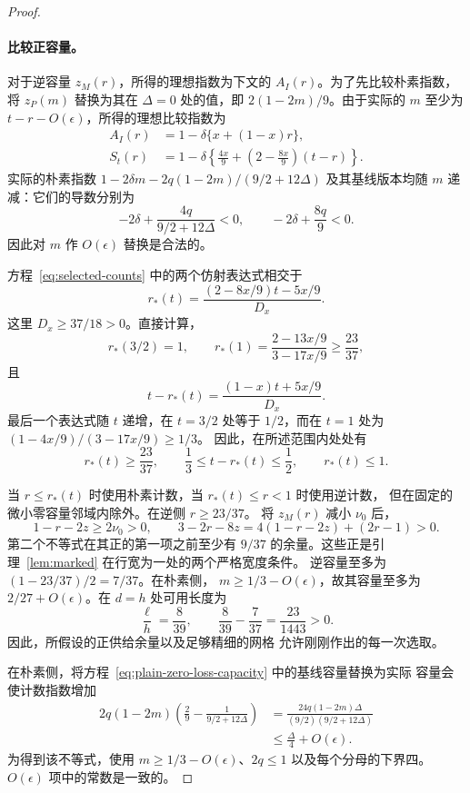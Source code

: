 \documentclass[11pt,a4paper]{article}
\numberwithin{equation}{section}
\numberwithin{figure}{section}
\theoremstyle{definition}
\theoremstyle{remark}
\begin{document}
\begin{proof}
\paragraph{比较正容量。}
对于逆容量 \(z_M(r)\)，所得的理想指数为下文的 \(A_I(r)\)。为了先比较朴素指数，将
\(z_P(m)\) 替换为其在 \(\Delta=0\) 处的值，即
\(2(1-2m)/9\)。由于实际的 \(m\) 至少为
\(t-r-O(\epsilon)\)，所得的理想比较指数为
\begin{equation}
 \begin{aligned}
 A_I(r)&=1-\delta\{x+(1-x)r\},\\
 S_t(r)&=1-\delta\left\{\frac{4x}{9}
          +\left(2-\frac{8x}{9}\right)(t-r)\right\}.
 \end{aligned}
 \label{eq:selected-counts}
\end{equation}
实际的朴素指数
\(1-2\delta m-2q(1-2m)/(9/2+12\Delta)\) 及其基线版本均随 \(m\) 递减：它们的导数分别为
\[
 -2\delta+\frac{4q}{9/2+12\Delta}<0,\qquad
 -2\delta+\frac{8q}{9}<0.
\]
因此对 \(m\) 作 \(O(\epsilon)\) 替换是合法的。

方程~\eqref{eq:selected-counts} 中的两个仿射表达式相交于
\[
 r_*(t)=
 \frac{(2-8x/9)t-5x/9}{D_x}.
\]
这里 \(D_x\ge37/18>0\)。直接计算，
\[
 r_*(3/2)=1,\qquad
 r_*(1)=\frac{2-13x/9}{3-17x/9}\ge\frac{23}{37},
\]
且
\[
 t-r_*(t)=\frac{(1-x)t+5x/9}{D_x}.
\]
最后一个表达式随 \(t\) 递增，在
\(t=3/2\) 处等于 \(1/2\)，而在 \(t=1\) 处为
\((1-4x/9)/(3-17x/9)\ge1/3\)。
因此，在所述范围内处处有
\[
 r_*(t)\ge\frac{23}{37},\qquad
 \frac13\le t-r_*(t)\le\frac12,\qquad r_*(t)\le1.
\]

当 \(r\le r_*(t)\) 时使用朴素计数，当 \(r_*(t)\le r<1\) 时使用逆计数，
但在固定的微小零容量邻域内除外。在逆侧 \(r\ge23/37\)。
将 \(z_M(r)\) 减小 \(\nu_0\) 后，
\[
 1-r-2z\ge2\nu_0>0,\qquad
 3-2r-8z=4(1-r-2z)+(2r-1)>0.
\]
第二个不等式在其正的第一项之前至少有 \(9/37\) 的余量。这些正是引理~\ref{lem:marked} 在行宽为一处的两个严格宽度条件。
逆容量至多为
\((1-23/37)/2=7/37\)。在朴素侧，
\(m\ge1/3-O(\epsilon)\)，故其容量至多为
\(2/27+O(\epsilon)\)。在 \(d=h\) 处可用长度为
\[
 \frac{\ell}{h}=\frac8{39},\qquad
 \frac8{39}-\frac7{37}=\frac{23}{1443}>0.
\]
因此，所假设的正供给余量以及足够精细的网格
允许刚刚作出的每一次选取。

在朴素侧，将方程~\eqref{eq:plain-zero-loss-capacity} 中的基线容量替换为实际
容量会使计数指数增加
\begin{equation}
 \begin{split}
 2q(1-2m)
 \left(\frac29-\frac1{9/2+12\Delta}\right)
 &=\frac{24q(1-2m)\Delta}{(9/2)(9/2+12\Delta)}\\
 &\le\frac{\Delta}{4}+O(\epsilon).
 \end{split}
 \label{eq:capacity-comparison}
\end{equation}
为得到该不等式，使用 \(m\ge1/3-O(\epsilon)\)、\(2q\le1\)
以及每个分母的下界四。\(O(\epsilon)\) 项中的常数是一致的。


\end{proof}
\end{document}
